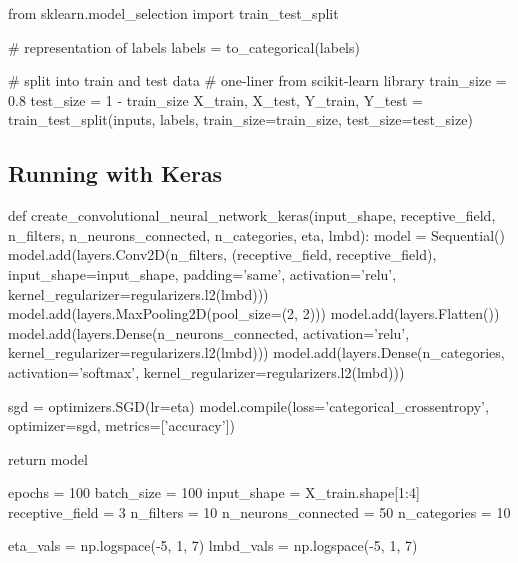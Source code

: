 \documentclass[%
oneside,                 %
final,                   %
10pt]{article}
\begin{document}
from sklearn.model_selection import train_test_split

# representation of labels
labels = to_categorical(labels)

# split into train and test data
# one-liner from scikit-learn library
train_size = 0.8
test_size = 1 - train_size
X_train, X_test, Y_train, Y_test = train_test_split(inputs, labels, train_size=train_size,
                                                    test_size=test_size)

\epycod


\subsection{Running with Keras}




























\bpycod
def create_convolutional_neural_network_keras(input_shape, receptive_field,
                                              n_filters, n_neurons_connected, n_categories,
                                              eta, lmbd):
    model = Sequential()
    model.add(layers.Conv2D(n_filters, (receptive_field, receptive_field), input_shape=input_shape, padding='same',
              activation='relu', kernel_regularizer=regularizers.l2(lmbd)))
    model.add(layers.MaxPooling2D(pool_size=(2, 2)))
    model.add(layers.Flatten())
    model.add(layers.Dense(n_neurons_connected, activation='relu', kernel_regularizer=regularizers.l2(lmbd)))
    model.add(layers.Dense(n_categories, activation='softmax', kernel_regularizer=regularizers.l2(lmbd)))
    
    sgd = optimizers.SGD(lr=eta)
    model.compile(loss='categorical_crossentropy', optimizer=sgd, metrics=['accuracy'])
    
    return model

epochs = 100
batch_size = 100
input_shape = X_train.shape[1:4]
receptive_field = 3
n_filters = 10
n_neurons_connected = 50
n_categories = 10

eta_vals = np.logspace(-5, 1, 7)
lmbd_vals = np.logspace(-5, 1, 7)
\end{document}
